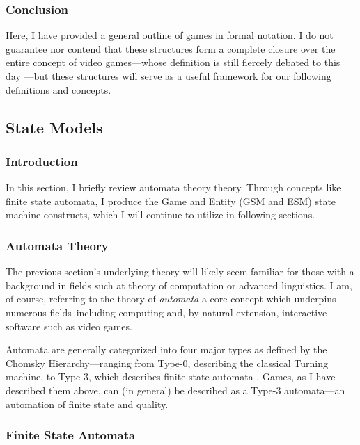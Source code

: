 \documentclass{report}
\begin{document}
\subsubsection{Conclusion}
Here, I have provided a general outline of games in formal notation. I do not guarantee nor contend that these structures form a complete closure over the entire concept of video games---whose definition is still fiercely debated to this day \cite{Knoop_2021}---but these structures will serve as a useful framework for our following definitions and concepts.

\subsection{State Models}

\subsubsection{Introduction} 
In this section, I briefly review automata theory theory. Through concepts like finite state automata, I produce the Game and Entity (GSM and ESM) state machine constructs, which I will continue to utilize in following sections.

\subsubsection{Automata Theory}
The previous section's underlying theory will likely seem familiar for those with a background in fields such at theory of computation or advanced linguistics. I am, of course, referring to the theory of \emph{automata} a core concept which underpins numerous fields--including computing and, by natural extension, interactive software such as video games. 

Automata are generally categorized into four major types as defined by the Chomsky Hierarchy---ranging from Type-0, describing the classical Turning machine, to Type-3, which describes finite state automata \cite{Chomsky1956ThreeMF}. Games, as I have described them above, can (in general) be described as a Type-3 automata---an automation of finite state and quality. 

\subsubsection{Finite State Automata}
\end{document}
